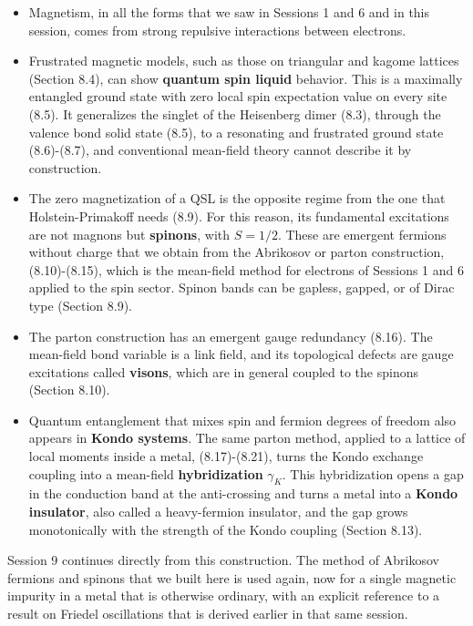 \begin{itemize}
\item Magnetism, in all the forms that we saw in Sessions 1 and 6 and in this session, comes from
  strong repulsive interactions between electrons.
\item Frustrated magnetic models, such as those on triangular and kagome lattices (Section 8.4),
  can show \textbf{quantum spin liquid} behavior. This is a maximally entangled ground state with
  zero local spin expectation value on every site (8.5). It generalizes the singlet of the
  Heisenberg dimer (8.3), through the valence bond solid state (8.5), to a resonating and
  frustrated ground state (8.6)-(8.7), and conventional mean-field theory cannot describe it by
  construction.
\item The zero magnetization of a QSL is the opposite regime from the one that Holstein-Primakoff
  needs (8.9). For this reason, its fundamental excitations are not magnons but \textbf{spinons},
  with $S=1/2$. These are emergent fermions without charge that we obtain from the Abrikosov or
  parton construction, (8.10)-(8.15), which is the mean-field method for electrons of Sessions 1
  and 6 applied to the spin sector. Spinon bands can be gapless, gapped, or of Dirac type
  (Section 8.9).
\item The parton construction has an emergent gauge redundancy (8.16). The mean-field bond variable
  is a link field, and its topological defects are gauge excitations called \textbf{visons}, which
  are in general coupled to the spinons (Section 8.10).
\item Quantum entanglement that mixes spin and fermion degrees of freedom also appears in
  \textbf{Kondo systems}. The same parton method, applied to a lattice of local moments inside a
  metal, (8.17)-(8.21), turns the Kondo exchange coupling into a mean-field
  \textbf{hybridization} $\gamma_K$. This hybridization opens a gap in the conduction band at the
  anti-crossing and turns a metal into a \textbf{Kondo insulator}, also called a heavy-fermion
  insulator, and the gap grows monotonically with the strength of the Kondo coupling
  (Section 8.13).
\end{itemize}

Session 9 continues directly from this construction. The method of Abrikosov fermions and spinons
that we built here is used again, now for a single magnetic impurity in a metal that is otherwise
ordinary, with an explicit reference to a result on Friedel oscillations that is derived earlier in
that same session.
